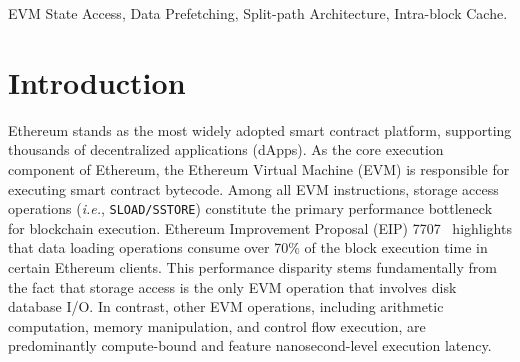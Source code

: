 \documentclass[conference]{IEEEtran}
\begin{document}
\begin{IEEEkeywords}
EVM State Access, Data Prefetching, Split-path Architecture, Intra-block Cache.
\end{IEEEkeywords}


\section{Introduction}


Ethereum stands as the most widely adopted smart contract platform, supporting thousands of decentralized applications (dApps). As the core execution component of Ethereum, the Ethereum Virtual Machine (EVM) is responsible for executing smart contract bytecode. Among all EVM instructions, storage access operations (\textit{i.e.}, \texttt{SLOAD/SSTORE}) constitute the primary performance bottleneck for blockchain execution. Ethereum Improvement Proposal (EIP) 7707~\cite{eip7707} highlights that data loading operations consume over 70\% of the block execution time in certain Ethereum clients. This performance disparity stems fundamentally from the fact that storage access is the only EVM operation that involves disk database I/O. In contrast, other EVM operations, including arithmetic computation, memory manipulation, and control flow execution, are predominantly compute-bound and feature nanosecond-level execution latency.
\end{document}
